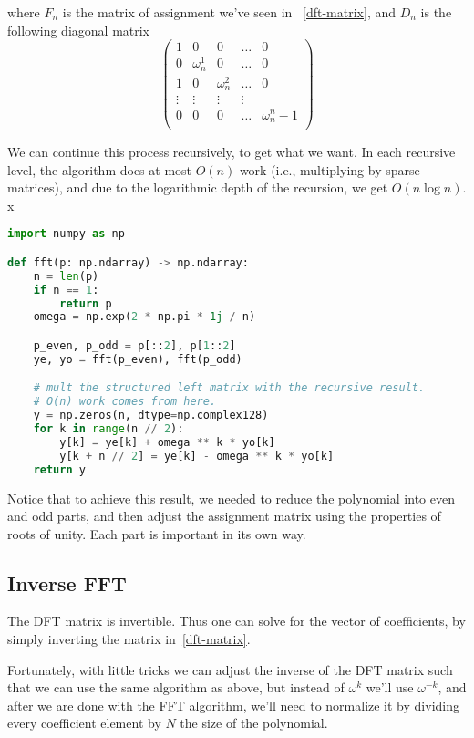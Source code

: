  where $F_n$ is the matrix of assignment we've seen in ~\ref{dft-matrix}, and 
 $D_n$ is the following diagonal matrix $$
 \begin{pmatrix}
  1 & 0 &0  & \dots& 0 \\
  0 & \omega_n^1 &0  & \dots& 0 \\
  1 & 0  &\omega_n^2  & \dots& 0 \\
  \vdots & \vdots & \vdots & \vdots &  \\
  0 & 0  &0  & \dots& \omega_n^n-1 \\
 \end{pmatrix} $$


 We can continue this process recursively, to get what we want.
 In each recursive level, the algorithm does at most $O(n)$ work (i.e., multiplying by sparse matrices),
  and due to the logarithmic depth of the recursion, we get $O(n\log{n})$.
x
\label{algorithm:fft}
  \begin{lstlisting}[language=Python,
    caption={fft algorithm in python}
  ]
import numpy as np

def fft(p: np.ndarray) -> np.ndarray:
    n = len(p)
    if n == 1:
        return p
    omega = np.exp(2 * np.pi * 1j / n)

    p_even, p_odd = p[::2], p[1::2] 
    ye, yo = fft(p_even), fft(p_odd)

    # mult the structured left matrix with the recursive result.
    # O(n) work comes from here.
    y = np.zeros(n, dtype=np.complex128)
    for k in range(n // 2):
        y[k] = ye[k] + omega ** k * yo[k]
        y[k + n // 2] = ye[k] - omega ** k * yo[k]
    return y
    \end{lstlisting}
    
    \begin{remark}[Summary]
      Notice that to achieve this result, we needed to reduce the polynomial into
      even and odd parts, and then adjust the assignment matrix using
      the properties of roots of unity. Each part is important in its own way.
    \end{remark}
\subsection{Inverse FFT}\label{ifft}

The DFT matrix is invertible.
Thus one can solve for the vector of coefficients,
by simply inverting the matrix in~\ref{dft-matrix}.

Fortunately, with little tricks we can adjust the inverse of the DFT matrix such that
we can use the same algorithm as above, but instead of
$\omega^k$ we'll use $\omega^{-k}$, and after we are done with the FFT
algorithm, we'll need to normalize it by dividing every coefficient element
by $N$ the size of the polynomial.

